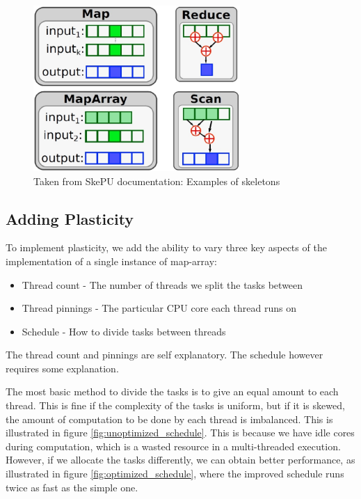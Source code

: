 \begin{figure}
	\centering
	\includegraphics[width=0.7\textwidth]{graphics/skepu_skeletons.jpg}
	\caption{Taken from SkePU documentation: Examples of skeletons}
	\label{fig:skepu_skeletons}
\end{figure}



\subsection{Adding Plasticity}
\label{subsection:design_adding_plasticity}

To implement plasticity, we add the ability to vary three key aspects of the implementation of a single instance of map-array:

\begin{itemize}
	\item Thread count - The number of threads we split the tasks between
	\item Thread pinnings - The particular CPU core each thread runs on
	\item Schedule - How to divide tasks between threads
\end{itemize}

The thread count and pinnings are self explanatory. The schedule however requires some explanation.

The most basic method to divide the tasks is to give an equal amount to each thread. This is fine if the complexity of the tasks is uniform, but if it is skewed, the amount of computation to be done by each thread is imbalanced. This is illustrated in figure \ref{fig:unoptimized_schedule}. This is because we have idle cores during computation, which is a wasted resource in a multi-threaded execution. However, if we allocate the tasks differently, we can obtain better performance, as illustrated in figure \ref{fig:optimized_schedule}, where the improved schedule runs twice as fast as the simple one.

